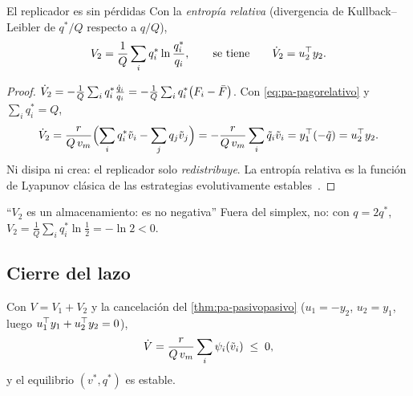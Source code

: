 \begin{proposicion}[label=prop:pa-replicadorlossless]{El replicador es sin pérdidas}
Con la \emph{entropía relativa} (divergencia de Kullback--Leibler de $q^*/Q$ respecto a $q/Q$),
\[
  V_2=\frac1Q\sum_iq_i^*\ln\frac{q_i^*}{q_i},
  \qquad\text{se tiene}\qquad \dot V_2=u_2^{\top} y_2 .
\]
\end{proposicion}

\begin{proof}
$\dot V_2=-\frac1Q\sum_iq_i^*\frac{\dot q_i}{q_i}=-\frac1Q\sum_iq_i^*\bigl(F_i-\bar F\bigr)$. Con \eqref{eq:pa-pagorelativo} y $\sum_iq_i^*=Q$,
\[
  \dot V_2=\frac{r}{Q\,v_m}\Bigl(\sum_iq_i^*\tilde v_i-\sum_jq_j\tilde v_j\Bigr)=-\frac{r}{Q\,v_m}\sum_i\tilde q_i\tilde v_i=y_1^{\top}(-\tilde q)=u_2^{\top} y_2 .
\]
Ni disipa ni crea: el replicador solo \emph{redistribuye}. La entropía relativa es la función de Lyapunov clásica de las estrategias evolutivamente estables~\citep{HoSi98}.
\end{proof}

\begin{trampa}[label=tr:pa-V2]{``$V_2$ es un almacenamiento: es no negativa''}
Fuera del simplex, no: con $q=2q^*$, $V_2=\frac1Q\sum_iq_i^*\ln\frac12=-\ln2<0$.
\end{trampa}

\subsection{Cierre del lazo}

Con $V=V_1+V_2$ y la cancelación del \cref{thm:pa-pasivopasivo} ($u_1=-y_2$, $u_2=y_1$, luego $u_1^{\top} y_1+u_2^{\top} y_2=0$),
\begin{equation}
  \dot V=\frac{r}{Q\,v_m}\sum_i\psi_i(\tilde v_i)\;\le\;0 ,
  \label{eq:pa-Vdotagua}
\end{equation}
y el equilibrio $(v^*,q^*)$ es estable.

